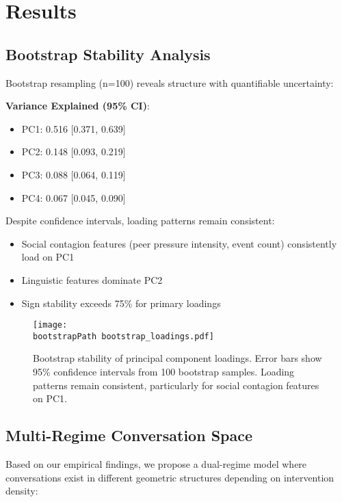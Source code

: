 \documentclass[11pt,letterpaper]{article}
\newcommand{\pcOneVarianceMean}{0.516}
\newcommand{\pcOneVarianceCI}{[0.371, 0.639]}
\newcommand{\pcTwoVarianceMean}{0.148}
\newcommand{\pcTwoVarianceCI}{[0.093, 0.219]}
\newcommand{\pcThreeVarianceMean}{0.088}
\newcommand{\pcThreeVarianceCI}{[0.064, 0.119]}
\newcommand{\pcFourVarianceMean}{0.067}
\newcommand{\pcFourVarianceCI}{[0.045, 0.090]}
\newcommand{\bootstrapSamples}{100}
\newcommand{\bootstrapPath}{../analysis/rigorous_analysis_outputs/bootstrap/}
\begin{document}
\section{Results}

\subsection{Bootstrap Stability Analysis}

Bootstrap resampling (n=\bootstrapSamples{}) reveals structure with quantifiable uncertainty:

\textbf{Variance Explained (95\% CI)}:
\begin{itemize}
    \item PC1: \pcOneVarianceMean{} \pcOneVarianceCI{}
    \item PC2: \pcTwoVarianceMean{} \pcTwoVarianceCI{}
    \item PC3: \pcThreeVarianceMean{} \pcThreeVarianceCI{}
    \item PC4: \pcFourVarianceMean{} \pcFourVarianceCI{}
\end{itemize}

Despite confidence intervals, loading patterns remain consistent:
\begin{itemize}
    \item Social contagion features (peer pressure intensity, event count) consistently load on PC1
    \item Linguistic features dominate PC2
    \item Sign stability exceeds 75\% for primary loadings
\end{itemize}

\begin{figure}[htbp]
\centering
\texttt{[image: \\bootstrapPath bootstrap\_loadings.pdf]}
\caption{Bootstrap stability of principal component loadings. Error bars show 95\% confidence intervals from \bootstrapSamples{} bootstrap samples. Loading patterns remain consistent, particularly for social contagion features on PC1.}
\label{fig:bootstrap_loadings}
\end{figure}

\subsection{Multi-Regime Conversation Space}

Based on our empirical findings, we propose a dual-regime model where conversations exist in different geometric structures depending on intervention density:
\end{document}
